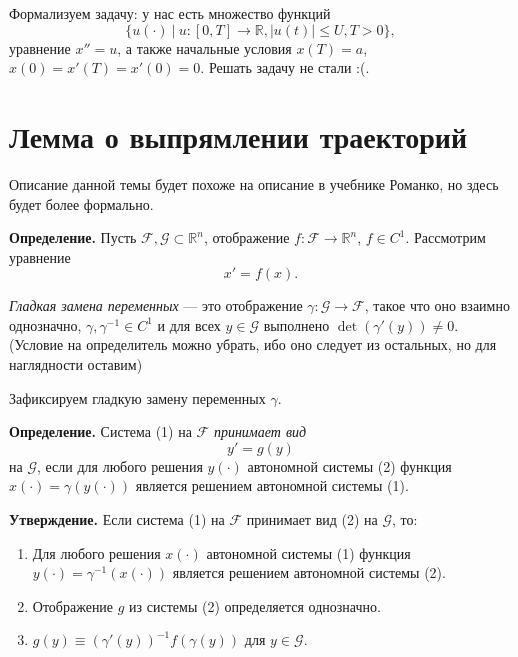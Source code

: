Формализуем задачу: у нас есть множество функций
\[
    \{u(\cdot)~|~u:[0, T] \to \mathbb R, |u(t)| \le U, T > 0\},
\]
уравнение $x'' = u$, а также начальные условия $x(T) = a$, $x(0) = x'(T) = x'(0) = 0$.
Решать задачу не стали :(.

\setcounter{equation}{0}
\section{Лемма о выпрямлении траекторий}
Описание данной темы будет похоже на описание в учебнике Романко, но здесь будет более формально.

\textbf{Определение.} Пусть $\mathcal F, \mathcal G \subset \mathbb R^n$, отображение $f: \mathcal F \to \mathbb R^n$, $f \in C^1$.
Рассмотрим уравнение
\begin{equation}
    x' = f(x).
\end{equation}

\textit{Гладкая замена переменных} --- это отображение $\gamma: \mathcal G \to \mathcal F$, такое что оно взаимно однозначно, $\gamma, \gamma^{-1} \in C^1$ и для всех $y \in \mathcal G$ выполнено $\det(\gamma'(y)) \ne 0$.
(Условие на определитель можно убрать, ибо оно следует из остальных, но для наглядности оставим)

Зафиксируем гладкую замену переменных $\gamma$.

\textbf{Определение.} Система (1) на $\mathcal F$ \textit{принимает вид}
\begin{equation}
    y' = g(y)
\end{equation}
на $\mathcal G$, если для любого решения $y(\cdot)$ автономной системы (2) функция $x(\cdot) = \gamma(y(\cdot))$ является решением автономной системы (1).

\textbf{Утверждение.} Если система (1) на $\mathcal F$ принимает вид (2) на $\mathcal G$, то:
\begin{enumerate}
    \item Для любого решения $x(\cdot)$ автономной системы (1) функция $y(\cdot) = \gamma^{-1}(x(\cdot))$ является решением автономной системы (2).
    \item Отображение $g$ из системы (2) определяется однозначно.
    \item $g(y) \equiv (\gamma'(y))^{-1} f(\gamma(y))$ для $y \in \mathcal G$.
\end{enumerate}

